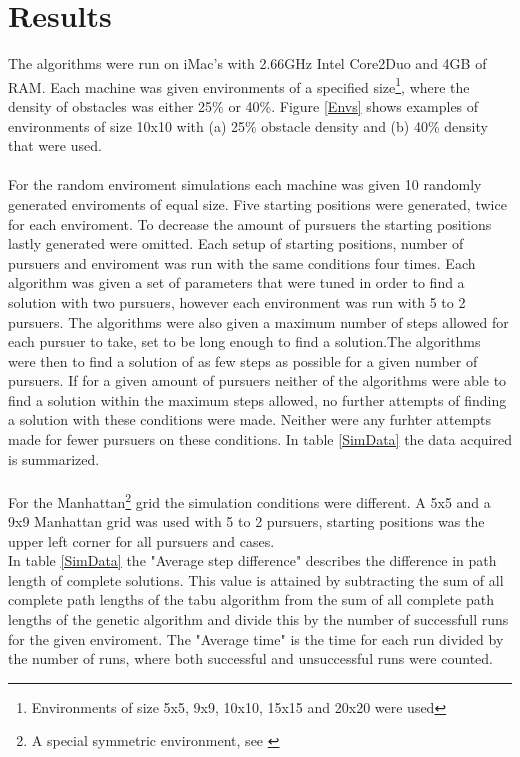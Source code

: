 \chapter{Results}
The algorithms were run on iMac's with 2.66GHz Intel Core2Duo and 4GB of RAM. Each machine was given environments of a specified size\footnote{Environments of size 5x5, 9x9, 10x10, 15x15 and 20x20 were used}, where the density of obstacles was either 25\% or 40\%. Figure \ref{Envs} shows examples of environments of size 10x10 with (a) 25\% obstacle density and (b) 40\% density that were used.\\
\\For the random enviroment simulations each machine was given 10 randomly generated enviroments of equal size. Five starting positions were generated, twice for each enviroment. To decrease the amount of pursuers the starting positions lastly generated were omitted. Each setup of starting positions, number of pursuers and enviroment was run with the same conditions four times. Each algorithm was given a set of parameters that were tuned in order to find a solution with two pursuers, however each environment was run with 5 to 2 pursuers. The algorithms were also given a maximum number of steps allowed for each pursuer to take, set to be long enough to find a solution.The algorithms were then to find a solution of as few steps as possible for a given number of pursuers. If for a given amount of pursuers neither of the algorithms were able to find a solution within the maximum steps allowed, no further attempts of finding a solution with these conditions were made. Neither were any furhter attempts made for fewer pursuers on these conditions. In table \ref{SimData} the data acquired is summarized.\\
\\For the Manhattan\footnote{A special symmetric environment, see \cite{paper1}} grid the simulation conditions were different. A 5x5 and a 9x9 Manhattan grid was used with 5 to 2 pursuers, starting positions was the upper left corner for all pursuers and cases.\\

In table \ref{SimData} the "Average step difference" describes the difference in path length of complete solutions. This value is attained by subtracting the sum of all complete path lengths of the tabu algorithm from the sum of all complete path lengths of the genetic algorithm and divide this by the number of successfull runs for the given enviroment. The "Average time" is the time for each run divided by the number of runs, where both successful and unsuccessful runs were counted.


